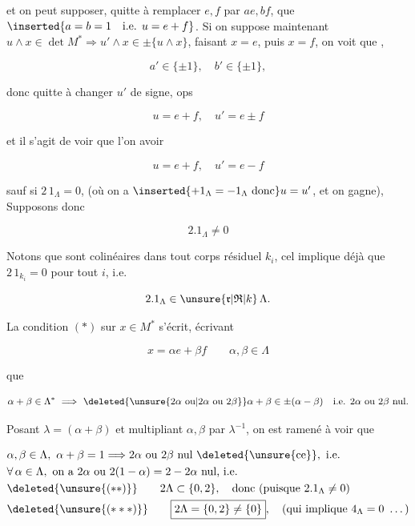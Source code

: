 et on peut \unsure{$=$} supposer, quitte à remplacer $e,f$ par $ae,bf$, que $\inserted{a=b=1\quad\text{i.e. }u=e+f}$. Si on suppose maintenant $u\wedge x\in\det M^*\Longrightarrow u'\wedge x\in\pm\{u\wedge x\}$, faisant $x=e$, puis $x=f$, on voit que ,

\[
a'\in\{\pm1\},\quad b'\in\{\pm1\},
\]

donc quitte à changer $u'$ de signe, ops

\[
u=e+f,\quad u'=e\pm f
\]


et il s'agit de voir que l'on  avoir

\[
u=e+f,\quad u'=e-f
\]

sauf  si $2\,1_\Lambda=0$, (où on a $\inserted{+1_\Lambda=-1_\Lambda\ \text{donc}}u=u'$, et on gagne),  Supposons donc

\[
2.1_\Lambda\ne0
\]

Notons que  sont colinéaires dans tout corps résiduel $k_i$, cel implique déjà que $2\,1_{k_i}=0$ pour tout $i$, i.e.

\[
2.1_\Lambda\in\unsure{\mathfrak r|\mathfrak R|k}\,\Lambda.
\]

La condition $(*)$ sur $x\in M^*$ s'écrit, écrivant

\[
x=\alpha e+\beta f\qquad\alpha,\beta\in\Lambda
\]

que

\[
\alpha+\beta\in\Lambda^*\ \Longrightarrow\ \deleted{\unsure{2\alpha\ \text{ou}|2\alpha\ \text{ou }2\beta}}\alpha+\beta\in\pm(\alpha-\beta)\quad\text{i.e. }2\alpha\ \text{ou }2\beta\ \text{nul.}
\]

Posant $\lambda=(\alpha+\beta)$ et multipliant $\alpha,\beta$ par $\lambda^{-1}$, on est ramené à voir que

\[
\begin{aligned}
&\alpha,\beta\in\Lambda,\ \alpha+\beta=1\Longrightarrow 2\alpha\ \text{ou }2\beta\ \text{nul }\deleted{\unsure{\text{ce}}},\ \text{i.e.}\\
&\forall\,\alpha\in\Lambda,\ \text{on a }2\alpha\ \text{ou }2(1-\alpha)=2-2\alpha\ \text{nul, i.e.}\\
&\deleted{\unsure{(**)}}\qquad 2\Lambda\subset\{0,2\},\quad\text{donc (puisque }2.1_\Lambda\ne0\text{)}\\
&\deleted{\unsure{(***)}}\qquad \boxed{2\Lambda=\{0,2\}\ne\{0\}},\quad\text{(qui implique }4_\Lambda=0\ \ldots\text{)}
\end{aligned}
\]

